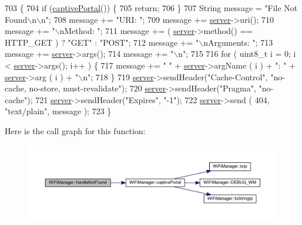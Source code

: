 \begin{DoxyCode}
703                                  \{
704   \textcolor{keywordflow}{if} (\hyperlink{class_wi_fi_manager_a4ef4298deb224212e5242c456669a973}{captivePortal}()) \{
705         \textcolor{keywordflow}{return};
706   \}
707   String message = \textcolor{stringliteral}{"File Not Found\(\backslash\)n\(\backslash\)n"};
708   message += \textcolor{stringliteral}{"URI: "};
709   message += \hyperlink{class_wi_fi_manager_a509523a01c0395cf0dc235b074f2a5ea}{server}->uri();
710   message += \textcolor{stringliteral}{"\(\backslash\)nMethod: "};
711   message += ( \hyperlink{class_wi_fi_manager_a509523a01c0395cf0dc235b074f2a5ea}{server}->method() == HTTP\_GET ) ? \textcolor{stringliteral}{"GET"} : \textcolor{stringliteral}{"POST"};
712   message += \textcolor{stringliteral}{"\(\backslash\)nArguments: "};
713   message += \hyperlink{class_wi_fi_manager_a509523a01c0395cf0dc235b074f2a5ea}{server}->args();
714   message += \textcolor{stringliteral}{"\(\backslash\)n"};
715 
716   \textcolor{keywordflow}{for} ( uint8\_t i = 0; i < \hyperlink{class_wi_fi_manager_a509523a01c0395cf0dc235b074f2a5ea}{server}->args(); i++ ) \{
717     message += \textcolor{stringliteral}{" "} + \hyperlink{class_wi_fi_manager_a509523a01c0395cf0dc235b074f2a5ea}{server}->argName ( i ) + \textcolor{stringliteral}{": "} + \hyperlink{class_wi_fi_manager_a509523a01c0395cf0dc235b074f2a5ea}{server}->arg ( i ) + \textcolor{stringliteral}{"\(\backslash\)n"};
718   \}
719   \hyperlink{class_wi_fi_manager_a509523a01c0395cf0dc235b074f2a5ea}{server}->sendHeader(\textcolor{stringliteral}{"Cache-Control"}, \textcolor{stringliteral}{"no-cache, no-store, must-revalidate"});
720   \hyperlink{class_wi_fi_manager_a509523a01c0395cf0dc235b074f2a5ea}{server}->sendHeader(\textcolor{stringliteral}{"Pragma"}, \textcolor{stringliteral}{"no-cache"});
721   \hyperlink{class_wi_fi_manager_a509523a01c0395cf0dc235b074f2a5ea}{server}->sendHeader(\textcolor{stringliteral}{"Expires"}, \textcolor{stringliteral}{"-1"});
722   \hyperlink{class_wi_fi_manager_a509523a01c0395cf0dc235b074f2a5ea}{server}->send ( 404, \textcolor{stringliteral}{"text/plain"}, message );
723 \}
\end{DoxyCode}
Here is the call graph for this function\+:
\nopagebreak
\begin{figure}[H]
\begin{center}
\leavevmode
\includegraphics[width=350pt]{d4/dc8/class_wi_fi_manager_a7d01f7de3e4b76acdabffac79fa3d0ab_cgraph}
\end{center}
\end{figure}

